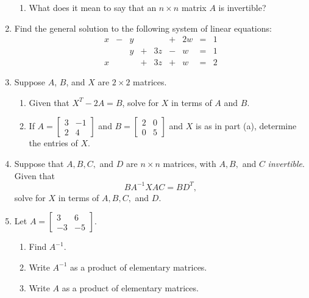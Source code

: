 \documentclass[12pt]{article}
\newcommand{\points}[1]{\marginpar{\hspace{24pt}[#1]}}
\begin{document}
\begin{enumerate}
\begin{enumerate}
\item What does it mean to say that an $n\times n$ matrix $A$ is invertible? \points{2}
\end{enumerate}
\newpage

\item Find the general solution to the following system of linear equations: \points{10}
\[
\begin{array}{ccccccccc}
x&-&y& &  &+&2w&=&1\\
 & &y&+&3z&-&w&=&1\\
x& & &+&3z&+&w&=&2 
\end{array}
\]

\newpage

\item Suppose $A$, $B$, and $X$ are $2\times 2$ matrices.
\begin{enumerate}
\item Given that $X^T-2A=B$, solve for $X$ in terms of $A$ and $B$.\points{3}

\vspace{1.25in}

\item If $A=\begin{bmatrix}3&-1\\2&4\end{bmatrix}$ and $B=\begin{bmatrix}2&0\\0&5\end{bmatrix}$ and $X$ is as in part (a), determine the entries of $X$. \points{3}

\vspace{2.25in}

\end{enumerate}
\item Suppose that $A,B,C,$ and $D$ are $n\times n$ matrices, with $A,B,$ and $C$ {\em invertible}. Given that \points{4}
\[
BA^{-1}XAC = BD^T,
\]
solve for $X$ in terms of $A,B,C,$ and $D$.
\newpage

\item Let $A=\begin{bmatrix}3&6\\-3&-5\end{bmatrix}$.
\begin{enumerate}
\item Find $A^{-1}$. \points{5}

\vspace{3in}

\item Write $A^{-1}$ as a product of elementary matrices. \points{3}

\vspace{2.5in}

\item Write $A$ as a product of elementary matrices. \points{2}
\end{enumerate}
\end{enumerate}
\end{document}
